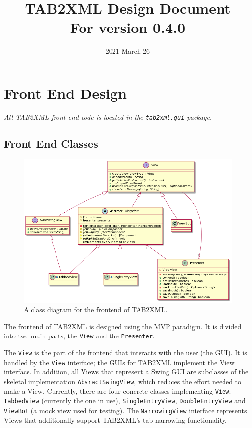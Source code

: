 \documentclass[11pt]{article}
\date{2021 March 26}
\title{TAB2XML Design Document\\\medskip
\large For version 0.4.0}
\begin{document}
\maketitle
\tableofcontents

\newpage

\section{Front End Design}
\label{sec:org5c26d21}
\emph{All TAB2XML front-end code is located in the \texttt{tab2xml.gui} package.}
\subsection{Front End Classes}
\label{sec:org66eb0f0}
\begin{figure}[htbp]
\centering
\includegraphics[width=.9\linewidth]{./Diagrams/frontend-class-diagram.png}
\caption{A class diagram for the frontend of TAB2XML.}
\end{figure}

The frontend of TAB2XML is designed using the \href{https://en.wikipedia.org/wiki/Model\%E2\%80\%93view\%E2\%80\%93presenter}{MVP} paradigm.  It is divided into two main parts, the \texttt{View} and the \texttt{Presenter}.

The \texttt{View} is the part of the frontend that interacts with the user (the GUI).  It is handled by the \texttt{View} interface; the GUIs for TAB2XML implement the View interface.  In addition, all Views that represent a Swing GUI are subclasses of the skeletal implementation \texttt{AbsractSwingView}, which reduces the effort needed to make a View.  Currently, there are four concrete classes implementing \texttt{View}: \texttt{TabbedView} (currently the one in use), \texttt{SingleEntryView}, \texttt{DoubleEntryView} and \texttt{ViewBot} (a mock view used for testing).  The \texttt{NarrowingView} interface represents Views that additionally support TAB2XML's tab-narrowing functionality.
\end{document}
